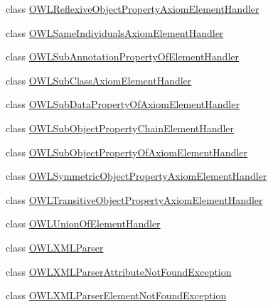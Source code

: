 \begin{DoxyCompactItemize}
\item 
class \hyperlink{classorg_1_1coode_1_1owlapi_1_1owlxmlparser_1_1_o_w_l_reflexive_object_property_axiom_element_handler}{O\-W\-L\-Reflexive\-Object\-Property\-Axiom\-Element\-Handler}
\item 
class \hyperlink{classorg_1_1coode_1_1owlapi_1_1owlxmlparser_1_1_o_w_l_same_individuals_axiom_element_handler}{O\-W\-L\-Same\-Individuals\-Axiom\-Element\-Handler}
\item 
class \hyperlink{classorg_1_1coode_1_1owlapi_1_1owlxmlparser_1_1_o_w_l_sub_annotation_property_of_element_handler}{O\-W\-L\-Sub\-Annotation\-Property\-Of\-Element\-Handler}
\item 
class \hyperlink{classorg_1_1coode_1_1owlapi_1_1owlxmlparser_1_1_o_w_l_sub_class_axiom_element_handler}{O\-W\-L\-Sub\-Class\-Axiom\-Element\-Handler}
\item 
class \hyperlink{classorg_1_1coode_1_1owlapi_1_1owlxmlparser_1_1_o_w_l_sub_data_property_of_axiom_element_handler}{O\-W\-L\-Sub\-Data\-Property\-Of\-Axiom\-Element\-Handler}
\item 
class \hyperlink{classorg_1_1coode_1_1owlapi_1_1owlxmlparser_1_1_o_w_l_sub_object_property_chain_element_handler}{O\-W\-L\-Sub\-Object\-Property\-Chain\-Element\-Handler}
\item 
class \hyperlink{classorg_1_1coode_1_1owlapi_1_1owlxmlparser_1_1_o_w_l_sub_object_property_of_axiom_element_handler}{O\-W\-L\-Sub\-Object\-Property\-Of\-Axiom\-Element\-Handler}
\item 
class \hyperlink{classorg_1_1coode_1_1owlapi_1_1owlxmlparser_1_1_o_w_l_symmetric_object_property_axiom_element_handler}{O\-W\-L\-Symmetric\-Object\-Property\-Axiom\-Element\-Handler}
\item 
class \hyperlink{classorg_1_1coode_1_1owlapi_1_1owlxmlparser_1_1_o_w_l_transitive_object_property_axiom_element_handler}{O\-W\-L\-Transitive\-Object\-Property\-Axiom\-Element\-Handler}
\item 
class \hyperlink{classorg_1_1coode_1_1owlapi_1_1owlxmlparser_1_1_o_w_l_union_of_element_handler}{O\-W\-L\-Union\-Of\-Element\-Handler}
\item 
class \hyperlink{classorg_1_1coode_1_1owlapi_1_1owlxmlparser_1_1_o_w_l_x_m_l_parser}{O\-W\-L\-X\-M\-L\-Parser}
\item 
class \hyperlink{classorg_1_1coode_1_1owlapi_1_1owlxmlparser_1_1_o_w_l_x_m_l_parser_attribute_not_found_exception}{O\-W\-L\-X\-M\-L\-Parser\-Attribute\-Not\-Found\-Exception}
\item 
class \hyperlink{classorg_1_1coode_1_1owlapi_1_1owlxmlparser_1_1_o_w_l_x_m_l_parser_element_not_found_exception}{O\-W\-L\-X\-M\-L\-Parser\-Element\-Not\-Found\-Exception}

\end{DoxyCompactItemize}
